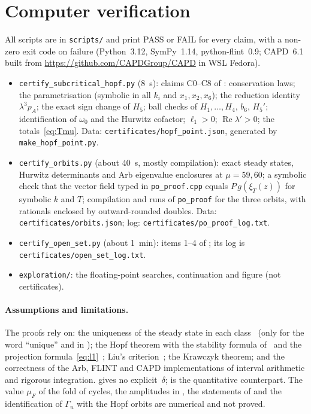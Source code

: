 \documentclass[11pt,a4paper]{report}
\begin{document}
\section{Computer verification}\label{sec:verif}
All scripts are in \texttt{scripts/} and print PASS or FAIL for every claim, with a non-zero exit code on failure (Python~3.12, SymPy~1.14, python-flint~0.9; CAPD~6.1 built from \url{https://github.com/CAPDGroup/CAPD} in WSL Fedora).
\begin{itemize}
\item \texttt{certify\_subcritical\_hopf.py} (8~s): claims C0--C8 of : conservation laws; the parametrisation (symbolic in all $k_i$ and $x_1,x_2,x_6$); the reduction identity $\lambda^3p_A$; the exact sign change of $H_5$; ball checks of $H_1,\dots,H_4$, $b_6$, $H_5'$; identification of $\omega_0$ and the Hurwitz cofactor; $\ell_1>0$; $\operatorname{Re}\lambda'>0$; the totals~\eqref{eq:Tmu}. Data: \texttt{certificates/hopf\_point.json}, generated by \texttt{make\_hopf\_point.py}.
\item \texttt{certify\_orbits.py} (about 40~s, mostly compilation): exact steady states, Hurwitz determinants and Arb eigenvalue enclosures at $\mu=59,60$; a symbolic check that the vector field typed in \texttt{po\_proof.cpp} equals $P\,g(\xi_T(z))$ for symbolic $k$ and $T$; compilation and runs of \texttt{po\_proof} for the three orbits, with rationals enclosed by outward-rounded doubles. Data: \texttt{certificates/orbits.json}; log: \texttt{certificates/po\_proof\_log.txt}.
\item \texttt{certify\_open\_set.py} (about 1~min): items 1--4 of ; its log is \texttt{certificates/\allowbreak open\_set\_log.txt}.
\item \texttt{exploration/}: the floating-point searches, continuation and figure (not certificates).
\end{itemize}

\paragraph{Assumptions and limitations.} The proofs rely on: the uniqueness of the steady state in each class~\autocite[Prop.~3.1]{CMS2019} (only for the word ``unique'' and in ); the Hopf theorem with the stability formula of~\autocite{HKW1981} and the projection formula~\eqref{eq:l1}~\autocite{Kuznetsov1999,Kuznetsov2004}; Liu's criterion~\autocite{Liu1994}; the Krawczyk theorem; and the correctness of the Arb, FLINT and CAPD implementations of interval arithmetic and rigorous integration.  gives no explicit~$\delta$;  is the quantitative counterpart. The value $\mu_F$ of the fold of cycles, the amplitudes in , the statements of  and the identification of $\Gamma_u$ with the Hopf orbits are numerical and not proved.
\end{document}
